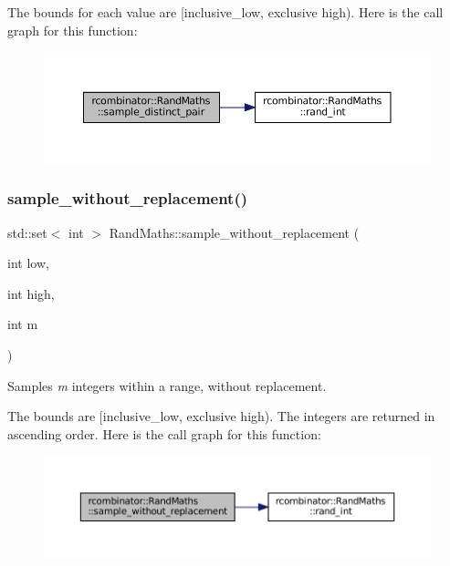The bounds for each value are \mbox{[}inclusive\+\_\+low, exclusive high). Here is the call graph for this function\+:
\nopagebreak
\begin{figure}[H]
\begin{center}
\leavevmode
\includegraphics[width=350pt]{classrcombinator_1_1RandMaths_aaa759efa3059b6793100cb6b6442f26d_cgraph}
\end{center}
\end{figure}
\mbox{\label{classrcombinator_1_1RandMaths_a2c31949c9ac03952cb0006e6a88e3d85}} 
\subsubsection{\texorpdfstring{sample\+\_\+without\+\_\+replacement()}{sample\_without\_replacement()}}
{\footnotesize\ttfamily std\+::set$<$ int $>$ Rand\+Maths\+::sample\+\_\+without\+\_\+replacement (\begin{DoxyParamCaption}\item[{int}]{low,  }\item[{int}]{high,  }\item[{int}]{m }\end{DoxyParamCaption})}



Samples {\itshape m} integers within a range, without replacement. 

The bounds are \mbox{[}inclusive\+\_\+low, exclusive high). The integers are returned in ascending order. Here is the call graph for this function\+:
\nopagebreak
\begin{figure}[H]
\begin{center}
\leavevmode
\includegraphics[width=350pt]{classrcombinator_1_1RandMaths_a2c31949c9ac03952cb0006e6a88e3d85_cgraph}
\end{center}
\end{figure}
\mbox{\label{classrcombinator_1_1RandMaths_a183686140a9da18ad40c7e048ee8914e}} 
